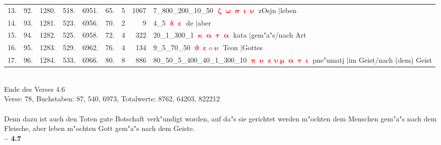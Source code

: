 \documentclass[a4paper,10pt,landscape]{article}
\begin{document}
\begin{tabular}{rrrrrrrrp{120mm}}
13.&92.&1280.&518.&6951.&65.&5&1067&7\_800\_200\_10\_50 \textcolor{red}{$\boldsymbol{\upzeta\upomega\upsigma\upiota\upnu}$} zOsjn $|$leben\\
14.&93.&1281.&523.&6956.&70.&2&9&4\_5 \textcolor{red}{$\boldsymbol{\updelta\upepsilon}$} de $|$aber\\
15.&94.&1282.&525.&6958.&72.&4&322&20\_1\_300\_1 \textcolor{red}{$\boldsymbol{\upkappa\upalpha\uptau\upalpha}$} kata $|$gem"a"s/nach Art\\
16.&95.&1283.&529.&6962.&76.&4&134&9\_5\_70\_50 \textcolor{red}{$\boldsymbol{\upvartheta\upepsilon\mathrm{o}\upnu}$} Teon $|$Gottes\\
17.&96.&1284.&533.&6966.&80.&8&886&80\_50\_5\_400\_40\_1\_300\_10 \textcolor{red}{$\boldsymbol{\uppi\upnu\upepsilon\upsilon\upmu\upalpha\uptau\upiota}$} pne"umatj $|$im Geist/nach (dem) Geist\\
\end{tabular}\medskip \\
Ende des Verses 4.6\\
Verse: 78, Buchstaben: 87, 540, 6973, Totalwerte: 8762, 64203, 822212\\
\\
Denn dazu ist auch den Toten gute Botschaft verk"undigt worden, auf da"s sie gerichtet werden m"ochten dem Menschen gem"a"s nach dem Fleische, aber leben m"ochten Gott gem"a"s nach dem Geiste.\\
\newpage 
{\bf -- 4.7}\\
\medskip \\
\end{document}
